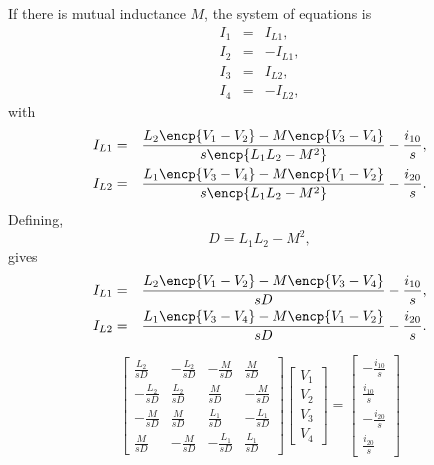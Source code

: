 \documentclass[a4paper, 12pt]{article}
\begin{document}
If there is mutual inductance $M$, the system of equations is
%
\begin{eqnarray}
  I_1 & = & I_{L1}, \\
  I_2 & = & -I_{L1}, \\
  I_3 & = & I_{L2}, \\
  I_4 & = & -I_{L2},
\end{eqnarray}
%
with
%
\begin{eqnarray}
  I_{L1} & = & \frac{L_2\encp{V_1 - V_2} - M\encp{V_3 - V_4}}{s\encp{L_1 L_2 - M^2}} - \frac{i_{10}}{s}, \\
  I_{L2} & = & \frac{L_1\encp{V_3 - V_4} - M\encp{V_1 - V_2}}{s\encp{L_1 L_2 - M^2}} - \frac{i_{20}}{s}.
\end{eqnarray}
%
Defining,
%
\begin{equation}
  D  = L_1 L_2 - M^2,
\end{equation}
%
gives
%
\begin{eqnarray}
  I_{L1} & = & \frac{L_2\encp{V_1 - V_2} - M\encp{V_3 - V_4}}{sD} - \frac{i_{10}}{s}, \\
  I_{L2} & = & \frac{L_1\encp{V_3 - V_4} - M\encp{V_1 - V_2}}{sD} - \frac{i_{20}}{s}.
\end{eqnarray}
%

\begin{equation}
  \begin{bmatrix}
    \frac{L_2}{sD} & -\frac{L_2}{sD} & -\frac{M}{sD}  & \frac{M}{sD} \\
   -\frac{L_2}{sD} & \frac{L_2}{sD}  & \frac{M}{sD}  & -\frac{M}{sD} \\
  -\frac{M}{sD} & \frac{M}{sD} &  \frac{L_1}{sD} & -\frac{L_1}{sD}   \\
   \frac{M}{sD} & -\frac{M}{sD} & -\frac{L_1}{sD} & \frac{L_1}{sD}  
  \end{bmatrix}
  \begin{bmatrix}
    V_1 \\ V_2 \\ V_3 \\ V_4
  \end{bmatrix}
=
\begin{bmatrix}
  -\frac{i_{10}}{s} \\ \frac{i_{10}}{s} \\
  -\frac{i_{20}}{s} \\ \frac{i_{20}}{s}
\end{bmatrix}
\label{eqn:mutual_stamp1}
\end{equation}
\end{document}
